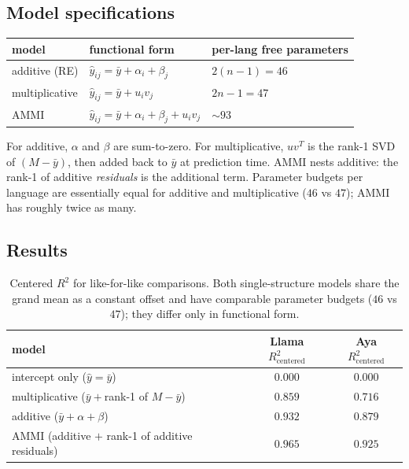 \documentclass[11pt]{article}
\begin{document}
\subsection{Model specifications}

\begin{center}
\small
\begin{tabular}{lll}
\toprule
model & functional form & per-lang free parameters \\
\midrule
additive (RE)   & $\hat y_{ij} = \bar y + \alpha_i + \beta_j$              & $2(n-1) = 46$ \\
multiplicative  & $\hat y_{ij} = \bar y + u_i v_j$                         & $2n - 1 = 47$ \\
AMMI            & $\hat y_{ij} = \bar y + \alpha_i + \beta_j + u_i v_j$    & $\sim 93$ \\
\bottomrule
\end{tabular}
\end{center}

For additive, $\alpha$ and $\beta$ are sum-to-zero. For multiplicative,
$u v^T$ is the rank-1 SVD of $(M - \bar y)$, then added back to $\bar y$
at prediction time. AMMI nests additive: the rank-1 of additive
\emph{residuals} is the additional term. Parameter budgets per language
are essentially equal for additive and multiplicative ($46$ vs $47$);
AMMI has roughly twice as many.

\subsection{Results}

\begin{table}[h]
\centering
\small
\begin{tabular}{lcc}
\toprule
model & Llama $R^2_{\text{centered}}$ & Aya $R^2_{\text{centered}}$ \\
\midrule
intercept only ($\hat y = \bar y$)               & $0.000$ & $0.000$ \\
multiplicative ($\bar y + $rank-1 of $M - \bar y$) & $0.859$ & $0.716$ \\
additive ($\bar y + \alpha + \beta$)              & $\mathbf{0.932}$ & $\mathbf{0.879}$ \\
AMMI (additive $+$ rank-1 of additive residuals)  & $0.965$ & $0.925$ \\
\bottomrule
\end{tabular}
\caption{Centered $R^2$ for like-for-like comparisons. Both single-structure
models share the grand mean as a constant offset and have comparable
parameter budgets ($46$ vs $47$); they differ only in functional form.}
\end{table}
\end{document}
